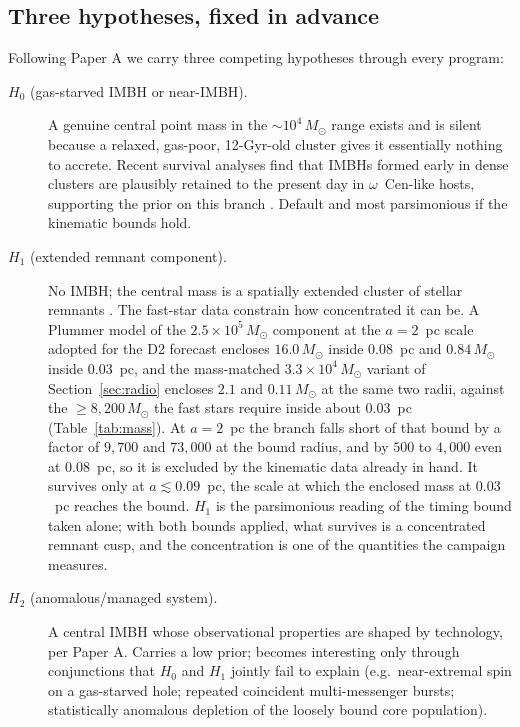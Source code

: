 \documentclass[11pt]{article}
\newcommand{\msun}{\ensuremath{M_\odot}}
\newcommand{\ocen}{\ensuremath{\omega}~Cen}
\begin{document}
\subsection{Three hypotheses, fixed in advance}
\label{sec:hypotheses}

Following Paper A we carry three competing hypotheses through every program:

\begin{description}
\item[$H_0$ (gas-starved IMBH or near-IMBH).] A genuine central point mass in the $\sim 10^{4}\,\msun$ range exists and is silent because a relaxed, gas-poor, 12-Gyr-old cluster gives it essentially nothing to accrete. Recent survival analyses find that IMBHs formed early in dense clusters are plausibly retained to the present day in \ocen-like hosts, supporting the prior on this branch \citep{Martinez2026}. Default and most parsimonious if the kinematic bounds hold.
\item[$H_1$ (extended remnant component).] No IMBH; the central mass is a spatially extended cluster of stellar remnants \citep{BanaresHernandez2025,BreenHeggie2013,Zocchi2019}. The fast-star data constrain how concentrated it can be. A Plummer model of the $2.5\times10^{5}\,\msun$ component at the $a = 2$~pc scale adopted for the D2 forecast encloses $16.0\,\msun$ inside $0.08$~pc and $0.84\,\msun$ inside $0.03$~pc, and the mass-matched $3.3\times10^{4}\,\msun$ variant of Section~\ref{sec:radio} encloses $2.1$ and $0.11\,\msun$ at the same two radii, against the $\geq 8{,}200\,\msun$ the fast stars require inside about $0.03$~pc (Table~\ref{tab:mass}). At $a = 2$~pc the branch falls short of that bound by a factor of $9{,}700$ and $73{,}000$ at the bound radius, and by $500$ to $4{,}000$ even at $0.08$~pc, so it is excluded by the kinematic data already in hand. It survives only at $a \lesssim 0.09$~pc, the scale at which the enclosed mass at $0.03$~pc reaches the bound. $H_1$ is the parsimonious reading of the timing bound taken alone; with both bounds applied, what survives is a concentrated remnant cusp, and the concentration is one of the quantities the campaign measures.
\item[$H_2$ (anomalous/managed system).] A central IMBH whose observational properties are shaped by technology, per Paper A. Carries a low prior; becomes interesting only through conjunctions that $H_0$ and $H_1$ jointly fail to explain (e.g.\ near-extremal spin on a gas-starved hole; repeated coincident multi-messenger bursts; statistically anomalous depletion of the loosely bound core population).
\end{description}
\end{document}
